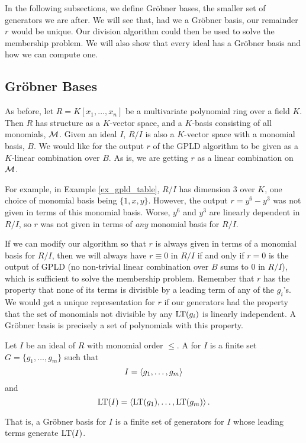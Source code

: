 In the following subsections, we define Gr\"obner bases, the smaller set of generators we are after.
We will see that, had we a Gr\"obner basis, our remainder $r$ would be unique.
Our division algorithm could then be used to solve the membership problem.
We will also show that every ideal has a Gr\"obner basis and how we can compute one.




\subsection{Gr\"obner Bases} \label{sec:groebner_bases}

As before, let $R = K[x_1, \ldots, x_n]$ be a multivariate polynomial ring over a field $K$.
Then $R$ has structure as a $K$-vector space, and a $K$-basis consisting of all monomials, $\cal M$.
Given an ideal $I$, $R/I$ is also a $K$-vector space with a monomial basis, $B$.
We would like for the output $r$ of the GPLD algorithm to be given as a $K$-linear combination over $B$.
As is, we are getting $r$ as a linear combination on $\cal M$.

For example, in Example \ref{ex_gpld_table}, $R/I$ has dimension 3 over $K$, one choice of monomial basis being $\{1, x, y\}$.
However, the output $r = y^6 - y^3$ was not given in terms of this monomial basis.
Worse, $y^6$ and $y^3$ are linearly dependent in $R/I$, so $r$ was not given in terms of \emph{any} monomial basis for $R/I$.

If we can modify our algorithm so that $r$ is always given in terms of a monomial basis for $R/I$,
then we will always have $r \equiv 0$ in $R/I$ if and only if $r = 0$ is the output of GPLD
(no non-trivial linear combination over $B$ sums to 0 in $R/I$),
which is sufficient to solve the membership problem.
Remember that $r$ has the property that none of its terms is divisible by a leading term of any of the $g_i$'s.
We would get a unique representation for $r$ if our generators had the property that
the set of monomials not divisible by any $\LT(g_i)$ is linearly independent.
A Gr\"obner basis is precisely a set of polynomials with this property.

\begin{definition}
  Let $I$ be an ideal of $R$ with monomial order $\leq$.
  A  for $I$ is a finite set $G = \{ g_1, \ldots, g_m \}$ such that
    \[ I = \pid{ g_1, \ldots, g_m } \]
  and
    \[ \LT(I) = \pid{ \LT(g_1), \ldots, \LT(g_m) }. \]
\end{definition}
That is, a Gr\"obner basis for $I$ is a finite set of generators for $I$ whose leading terms generate $\LT(I)$.


